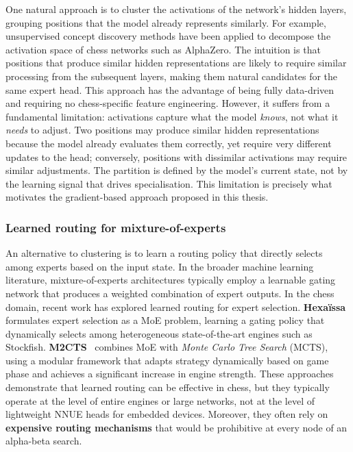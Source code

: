 One natural approach is to cluster the activations of the network's hidden layers, grouping positions that the model already represents similarly. For example, unsupervised concept discovery methods have been applied to decompose the activation space of chess networks such as AlphaZero. The intuition is that positions that produce similar hidden representations are likely to require similar processing from the subsequent layers, making them natural candidates for the same expert head. This approach has the advantage of being fully data-driven and requiring no chess-specific feature engineering. However, it suffers from a fundamental limitation: activations capture what the model \emph{knows}, not what it \emph{needs} to adjust. Two positions may produce similar hidden representations because the model already evaluates them correctly, yet require very different updates to the head; conversely, positions with dissimilar activations may require similar adjustments. The partition is defined by the model's current state, not by the learning signal that drives specialisation. This limitation is precisely what motivates the gradient-based approach proposed in this thesis.

\subsubsection{Learned routing for mixture-of-experts}\label{sec:learned-routing-chess}

An alternative to clustering is to learn a routing policy that directly selects among experts based on the input state. In the broader machine learning literature, mixture-of-experts architectures typically employ a learnable gating network that produces a weighted combination of expert outputs. In the chess domain, recent work has explored learned routing for expert selection. \textbf{Hexa{\"i}ssa}~\cite{ngo2026hexaissa} formulates expert selection as a MoE problem, learning a gating policy that dynamically selects among heterogeneous state-of-the-art engines such as Stockfish. \textbf{M2CTS}~\cite{helfenstein2024m2cts} combines MoE with \emph{Monte Carlo Tree Search} (MCTS), using a modular framework that adapts strategy dynamically based on game phase and achieves a significant increase in engine strength. These approaches demonstrate that learned routing can be effective in chess, but they typically operate at the level of entire engines or large networks, not at the level of lightweight NNUE heads for embedded devices. Moreover, they often rely on \textbf{expensive routing mechanisms} that would be prohibitive at every node of an alpha-beta search.

